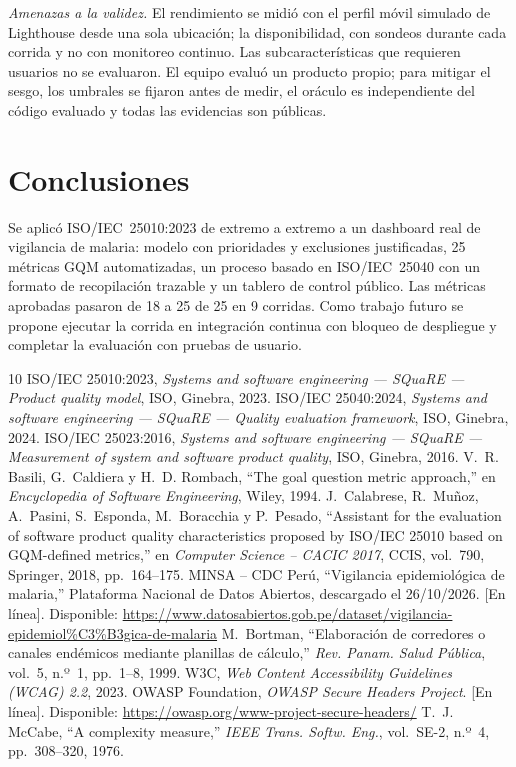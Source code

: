 \documentclass[conference,a4paper]{IEEEtran}
\begin{document}
\emph{Amenazas a la validez.} El rendimiento se midió con el perfil móvil simulado de Lighthouse desde una sola ubicación; la disponibilidad, con sondeos durante cada corrida y no con monitoreo continuo. Las subcaracterísticas que requieren usuarios no se evaluaron. El equipo evaluó un producto propio; para mitigar el sesgo, los umbrales se fijaron antes de medir, el oráculo es independiente del código evaluado y todas las evidencias son públicas.

\section{Conclusiones}
Se aplicó ISO/IEC~25010:2023 de extremo a extremo a un dashboard real de vigilancia de malaria: modelo con prioridades y exclusiones justificadas, 25 métricas GQM automatizadas, un proceso basado en ISO/IEC~25040 con un formato de recopilación trazable y un tablero de control público. Las métricas aprobadas pasaron de 18 a 25 de 25 en 9 corridas. Como trabajo futuro se propone ejecutar la corrida en integración continua con bloqueo de despliegue y completar la evaluación con pruebas de usuario.

\begin{thebibliography}{10}
 ISO/IEC 25010:2023, \emph{Systems and software engineering --- SQuaRE --- Product quality model}, ISO, Ginebra, 2023.
 ISO/IEC 25040:2024, \emph{Systems and software engineering --- SQuaRE --- Quality evaluation framework}, ISO, Ginebra, 2024.
 ISO/IEC 25023:2016, \emph{Systems and software engineering --- SQuaRE --- Measurement of system and software product quality}, ISO, Ginebra, 2016.
 V.~R. Basili, G.~Caldiera y H.~D. Rombach, ``The goal question metric approach,'' en \emph{Encyclopedia of Software Engineering}, Wiley, 1994.
 J.~Calabrese, R.~Muñoz, A.~Pasini, S.~Esponda, M.~Boracchia y P.~Pesado, ``Assistant for the evaluation of software product quality characteristics proposed by ISO/IEC 25010 based on GQM-defined metrics,'' en \emph{Computer Science -- CACIC 2017}, CCIS, vol.~790, Springer, 2018, pp.~164--175.
 MINSA -- CDC Perú, ``Vigilancia epidemiológica de malaria,'' Plataforma Nacional de Datos Abiertos, descargado el 26/10/2026. [En línea]. Disponible: \url{https://www.datosabiertos.gob.pe/dataset/vigilancia-epidemiol\%C3\%B3gica-de-malaria}
 M.~Bortman, ``Elaboración de corredores o canales endémicos mediante planillas de cálculo,'' \emph{Rev. Panam. Salud Pública}, vol.~5, n.º~1, pp.~1--8, 1999.
 W3C, \emph{Web Content Accessibility Guidelines (WCAG) 2.2}, 2023.
 OWASP Foundation, \emph{OWASP Secure Headers Project}. [En línea]. Disponible: \url{https://owasp.org/www-project-secure-headers/}
 T.~J. McCabe, ``A complexity measure,'' \emph{IEEE Trans. Softw. Eng.}, vol.~SE-2, n.º~4, pp.~308--320, 1976.
\end{thebibliography}
\end{document}
